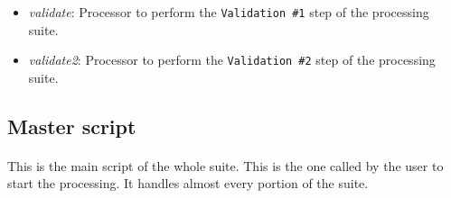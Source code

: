 \documentclass[12pt]{article}
\begin{document}
\begin{itemize}
\begin{itemize}
\begin{itemize}
			\item create\_bench\_apply\_mac.py: Creates RAT macro to run benchmarking - loads the new constants and applies on laserball run.
			\item create\_pca\_proc\_mac.py: Creates RAT macro to run PCA processor for given dataset.
			\item delete\_old\_couchdb.py: Helper script to delete CouchDB documents by type.
			\item get\_belly\_fibres.py: Helper script to create ratDB file containing the list of fibres affected by belly plates (loaded from CouchDB document).
			\item load\_db.py: Helper script to load default fibre directions from ratDB.
			\item make\_ratdb\_table.py: Creates ratDB table from PCA table. This is loaded by the PCA processor to apply corrections to hit times.
			\item master.py: The brain of operations. See Subsection~\ref{sub:master}.
			\item upload\_bench.py: Parses data from benchmark comparison scripts and uploads a CouchDB document.
			\item upload\_env.py: Parses the environment variables and uploads a CouchDB document.
			\item upload\_fits.py: Parses the data from fits and uploads a CouchDB document.
			\item upload\_radtb.py: Uploads ratDB table to postgres. 
			\item upload\_val1.py: Parses the data from \texttt{Validation \#1} step and uploads a CouchDB document.
			\item upload\_val2.py: Parses the data from \texttt{Validation \#2} step and uploads a CouchDB document.
		\end{itemize}
		\item \textit{validate}: Processor to perform the \texttt{Validation \#1} step of the processing suite.
		\item \textit{validate2}: Processor to perform the \texttt{Validation \#2} step of the processing suite.
	\end{itemize}
\end{itemize}

\clearpage

\subsection{Master script}\label{sub:master}
\paragraph{}
This is the main script of the whole suite. This is the one called by the user to start the processing. It handles almost every portion of the suite.
\end{document}
